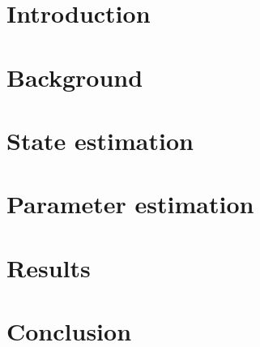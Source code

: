 \documentclass[english,12pt]{article}
\theoremstyle{definition}
\begin{document}

\makecoverpage



%


\tableofcontents

%


\cleardoublepage
\storeinipagenumber
{}
\setcounter{page}{1}


\section{Introduction}



\thispagestyle{empty}


\clearpage

\section{Background}




\section{State estimation}


\section{Parameter estimation}



\section{Results}


\section{Conclusion}


	
\clearpage
\listoftodos
\clearpage
\appendix
{}
\end{document}
